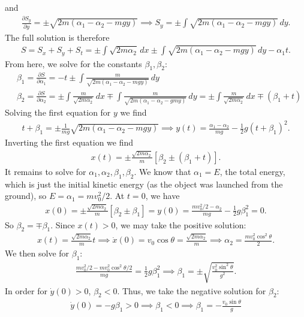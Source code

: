 \documentclass{article}
\theoremstyle{definition}
\newcommand{\p}{\partial}
\newcommand{\al}{\alpha}
\newcommand{\be}{\beta}
\newcommand{\f}[2]{\frac{#1}{#2}}
\newcommand{\lb}{\left[}
\newcommand{\rb}{\right]}
\begin{document}
and 
\begin{align*}
\f{\p S_y}{\p y} = \pm \sqrt{2m(\al_1-\al_2 - mgy)}  \implies S_y = \pm \int \sqrt{2m(\al_1-\al_2 - mgy)}\,dy.
\end{align*}
The full solution is therefore
\begin{align*}
S = S_x + S_y + S_t = \pm \int \sqrt{2m\al_2}\,dx \pm \int \sqrt{2m(\al_1-\al_2 - mgy)}\,dy -\al_1 t.
\end{align*}
From here, we solve for the constants $\be_1,\be_2$:
\begin{align*}
&\be_1 = \f{\p S}{\p \al_1} = -t \pm \int \f{m}{\sqrt{2m(\al_1-\al_2 - mgy)}}\,dy \\
&\be_2 = \f{\p S}{\p \al_2} = \pm \int \f{m}{\sqrt{2m \al_2}}\,dx \mp  \int \f{m}{\sqrt{2m(\al_1 - \al_2 - gmy)}}\,dy = \pm \int \f{m}{\sqrt{2m \al_2}}\,dx \mp (\be_1 + t)
\end{align*}
Solving the first equation for $y$ we find 
\begin{align*}
t + \be_1 = \pm \f{1}{mg} \sqrt{2m(\al_1 - \al_2 - mgy)} \implies y(t) = \f{\al_1 - \al_2}{mg} - \f{1}{2}g(t+\be_1)^2.
\end{align*}
Inverting the first equation we find 
\begin{align*}
x(t) = \pm  \f{\sqrt{2m\al_2}}{m} \lb \be_2 \pm (\be_1 + t) \rb.
\end{align*}
It remains to solve for $\al_1,\al_2, \be_1,\be_2$. We know that $\al_1 = E$, the total energy, which is just the initial kinetic energy (as the object was launched from the ground), so $E = \al_1= mv_0^2/2$. At $t=0$, we have
\begin{align*}
x(0) = \pm \f{\sqrt{2m \al_2}}{m}[\be_2 \pm \be_1] = y(0) =  \f{mv_0^2/2 - \al_2}{mg} - \f{1}{2}g\be_1^2 =0.
\end{align*} 
So $\be_2 = \mp \be_1$. Since $x(t)> 0$, we may take the positive solution:
\begin{align*}
x(t) = \f{\sqrt{2m\al_2}}{m}t \implies \dot x(0) = v_0\cos \theta = \f{\sqrt{2m\al_2}}{m} \implies \al_2 = \f{m v_0^2\cos^2\theta}{2}.
\end{align*}
We then solve for $\be_1$:
\begin{align*}
\f{mv_0^2/2 - mv_0^2\cos^2\theta/2}{mg} = \f{1}{2}g\be_1^2 \implies \be_1 = \pm \sqrt{\f{v_0^2\sin^2\theta}{g^2}}.
\end{align*}
In order for $\dot y(0) > 0$, $\be_2 < 0$. Thus, we take the negative solution for $\be_2$:
\begin{align*}
\dot y(0) = -g\be_1 > 0\implies \be_1 < 0 \implies \be_1 = -\f{v_0 \sin\theta}{g}
\end{align*}
\end{document}
